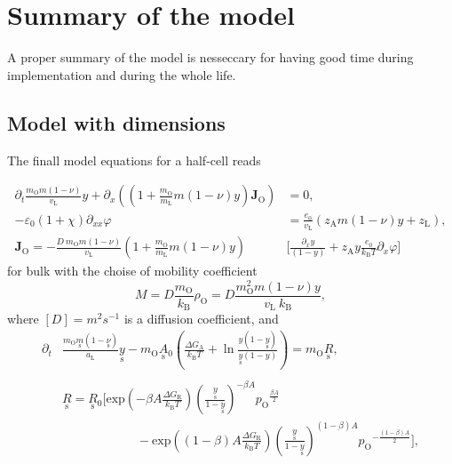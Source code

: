 \documentclass{article}
\numberwithin{equation}{section}
\newcommand{\us}[1]{\underset{\textrm{s}}{#1}{}}
\def\kB{k_\mathrm{B}}
\def\Ox{\mathrm{O}}
\def\zL{z_\mathrm{L}}
\def\mL{m_\mathrm{L}}
\def\vL{v_\mathrm{L}}
\def\aL{a_\mathrm{L}}
\def\DGA{\Delta G_\textrm{A}  }
\def\DGR{\Delta G_\textrm{R}  }
\begin{document}




\section{Summary of the model}
A proper summary of the model is nesseccary for having good time during implementation and during the whole life. 

\subsection{Model with dimensions}
The finall model equations for a half-cell reads

\begin{subequations}
\begin{align}
\partial_t \frac{m_\Ox m (1- \nu)}{\vL} y
+
\partial_x 
\left(
	\left(
		1
		+
		\frac{m_\Ox}{\mL} m (1 - \nu) y
	\right)
	\bm J_\Ox
\right)
&= 
0,
\\
- \varepsilon_0 (1 + \chi) \partial_{xx} \varphi 
&= 
\frac{e_0}{\vL}
\left(
	z_\textrm{A} m (1 - \nu) y
	+
	\zL
\right),
\\
\bm J_\Ox 
=
- \frac{D \ m_\Ox m (1 - \nu)}{\vL}
\left(
	1
	+
	\frac{m_\Ox}{\mL} m (1 - \nu) y
\right)
&\Bigg[
	\frac	
	{\partial_x y}
	{(1- y)}
	+ 
	z_\textrm{A} y \frac{e_0}{\kB T}
	\partial_x \varphi
\Bigg]
\end{align}
\end{subequations}
for bulk with the choise of mobility coefficient 
$$M = D \frac{m_\Ox}{\kB} \rho_\Ox = D \frac{m_\Ox^2 m (1 - \nu) y}{\vL \ \kB},$$ 
where $[D] = m^2 s^{-1}$ is a diffusion coefficient, and
\begin{subequations}
\begin{align}
\partial_t &\frac{m_\Ox \us m (1- \us \nu)}{\aL} \us y
-
m_\Ox \us A_0 
\left(
	\frac{\DGA}{\kB T}
	+
	\ln \frac{y(1- \us y)}{\us y (1- y)}
\right)
=
m_\Ox \us R,
\\ \nonumber
\\
&\us R
=
\us R_0
\Bigg[
	\textrm{exp}
	\left(
		{-\beta A \frac{\DGR}{\kB T}}
	\right)
	\left(
		\frac{\us y}{1- \us y}
	\right)^{-\beta A}
	{p_\Ox}^{\frac{\beta A}{2}}
\\ \nonumber
	&\quad \quad \quad \quad \quad \quad	
	-
	\textrm{exp}
	\left(
		{(1-\beta) A \frac{\DGR}{\kB T}}
	\right)
	\left(
		\frac{\us y}{1- \us y}
	\right)^{(1-\beta) A}
	{p_\Ox}^{-\frac{(1-\beta) A}{2}}
\Bigg],
\end{align}
\end{subequations}
\end{document}
